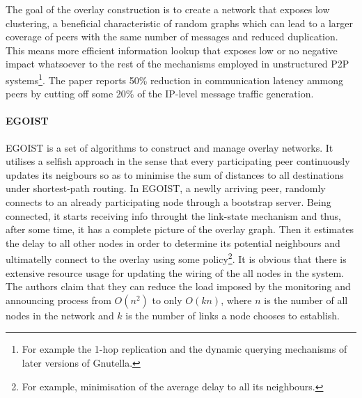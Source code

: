 The goal of the overlay construction is to create a network that exposes low
clustering, a beneficial characteristic of random graphs which can lead to a
larger coverage of peers with the same number of messages and reduced
duplication. This means more efficient information lookup that exposes low or no
negative impact whatsoever to the rest of the mechanisms employed in
unstructured P2P systems\footnote{For example the 1-hop replication and the
dynamic querying mechanisms of later versions of Gnutella.}. The paper reports
50\% reduction in communication latency ammong peers by cutting off some 20\% of
the IP-level message traffic generation.

\paragraph*{\bf EGOIST}
EGOIST \cite{egoist_2008} is a set of algorithms to construct and manage overlay
networks. It utilises a selfish approach in the sense that every participating
peer continuously updates its neigbours so as to minimise the sum of distances
to all destinations under shortest-path routing. In EGOIST, a newlly arriving
peer, randomly connects to an already participating node through a bootstrap
server. Being connected, it starts receiving info throught the link-state
mechanism and thus, after some time, it has a complete picture of the overlay
graph. Then it estimates the delay to all other nodes in order to determine its
potential neighbours and ultimatelly connect to the overlay using some
policy\footnote{For example, minimisation of the average delay to all its
neighbours.}. It is obvious that there is extensive resource usage for updating
the wiring of the all nodes in the system. The authors claim that they can
reduce the load imposed by the monitoring and announcing process from $O(n^2)$
to only $O(kn)$, where $n$ is the number of all nodes in the network and $k$ is
the number of links a node chooses to establish.

